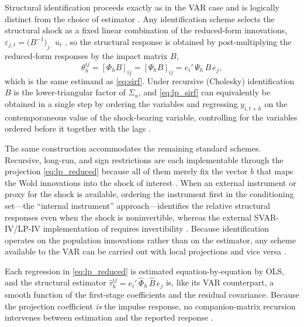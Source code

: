 Structural identification proceeds exactly as in the VAR case and is
logically distinct from the choice of estimator
\parencite{plagborg2021local}. Any identification scheme selects the
structural shock as a fixed linear combination of the reduced-form
innovations, $\varepsilon_{j,t} = \bigl(B^{-1}\bigr)_{j\cdot}\, u_t$
\parencite[p.~967]{plagborg2021local}, so the structural response is obtained
by post-multiplying the reduced-form responses by the impact matrix $B$,
%
\begin{equation}
    \theta_h^{ij} = [\Phi_h B]_{ij} = [\Psi_h B]_{ij}
                  = e_i'\, \Psi_h\, B\, e_j,
    \label{eq:lp_sirf}
\end{equation}
%
which is the same estimand as \eqref{eq:sirf}. Under recursive
(Cholesky) identification $B$ is the lower-triangular factor of $\Sigma_u$,
and \eqref{eq:lp_sirf} can equivalently be obtained in a single step by
ordering the variables and regressing $y_{i,t+h}$ on the contemporaneous
value of the shock-bearing variable, controlling for the variables ordered
before it together with the lags \parencites{jorda2005estimation}{plagborg2021local}.
 
The same construction accommodates the remaining standard schemes. Recursive, long-run, and sign restrictions are each implementable through the projection \eqref{eq:lp_reduced} because all of them merely fix the vector $b$ that maps the Wold innovations into the shock of interest
\parencite[p.~967]{plagborg2021local}. When an external instrument or proxy for the shock is available, ordering the instrument first in the conditioning set---the ``internal instrument'' approach---identifies the relative structural responses even when the shock is noninvertible, whereas the external SVAR-IV/LP-IV implementation of \textcite{stock2018identification} requires invertibility \parencite[p.~973]{plagborg2021local}. Because identification operates on the population innovations rather than on the estimator, any scheme available to the VAR can be carried out with local projections and vice versa \parencite[p.~975]{plagborg2021local}.
 
Each regression in \eqref{eq:lp_reduced} is estimated equation-by-equation by OLS, and the structural estimator $\hat{\tau}_h^{ij} = e_i'\, \hat{\Phi}_h\, \hat{B}\, e_j$ is, like its VAR counterpart, a smooth function of the first-stage coefficients and the residual covariance. Because the projection coefficient \emph{is} the impulse response, no companion-matrix recursion intervenes between estimation and the reported response
\parencite[p.~65]{jorda2025local}. 



